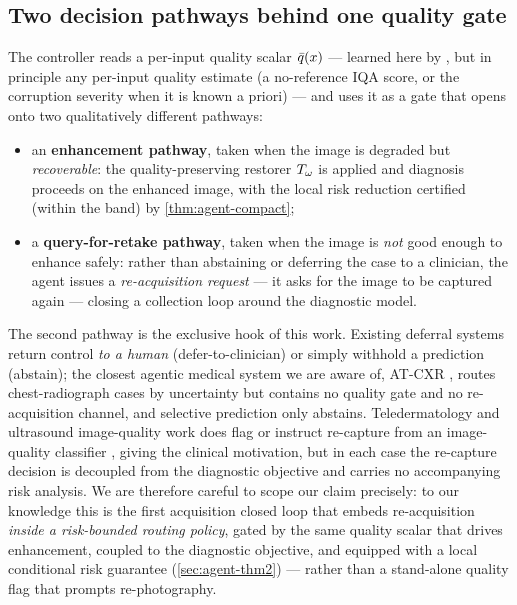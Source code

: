 \subsection{Two decision pathways behind one quality gate}\label{sec:agent-pathways}
The controller reads a per-input quality scalar $\bar{q}(x)$ --- learned here by \visiscore{}, but in
principle any per-input quality estimate (\eg a no-reference IQA score, or the corruption severity
when it is known a priori) --- and uses it as a gate that opens onto two qualitatively different
pathways:
\begin{itemize}
\item an \textbf{enhancement pathway}, taken when the image is degraded but \emph{recoverable}: the
quality-preserving restorer $T_\omega$ is applied and diagnosis proceeds on the enhanced image, with the
local risk reduction certified (within the band) by \cref{thm:agent-compact};
\item a \textbf{query-for-retake pathway}, taken when the image is \emph{not} good enough to enhance
safely: rather than abstaining or deferring the case to a clinician, the agent issues a
\emph{re-acquisition request} --- it asks for the image to be captured again --- closing a
collection loop around the diagnostic model.
\end{itemize}
The second pathway is the exclusive hook of this work. Existing deferral systems return control
\emph{to a human} (defer-to-clinician) or simply withhold a prediction (abstain); the closest
agentic medical system we are aware of, AT-CXR \citep{atcxr2025}, routes chest-radiograph cases by
uncertainty but contains no quality gate and no re-acquisition channel, and selective prediction
\citep{geifman2017selective} only abstains. Teledermatology and ultrasound image-quality work does
flag or instruct re-capture from an image-quality classifier
\citep{vodrahalli2021teledermatology,jalaboi2023explainable,zhao2020lungus}, giving the clinical
motivation, but in each case the re-capture decision is decoupled from the diagnostic objective and
carries no accompanying risk analysis. We are therefore careful to scope our claim precisely: to
our knowledge this is the first acquisition closed loop that embeds re-acquisition \emph{inside a
risk-bounded routing policy}, gated by the same quality scalar that drives enhancement, coupled to
the diagnostic objective, and equipped with a local conditional risk guarantee
(\cref{sec:agent-thm2}) --- rather than a stand-alone quality flag that prompts re-photography.

